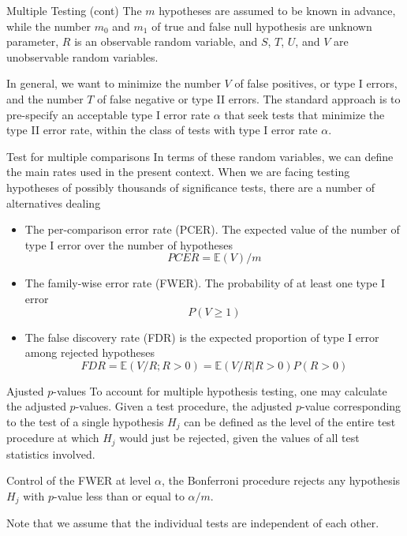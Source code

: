 \documentclass{beamer}
\begin{document}
\begin{frame}{Multiple Testing (cont)}	
	The $m$ hypotheses are assumed to be known in advance, while the number $m_0$ and $m_1$ of true and false null hypothesis are unknown parameter, $R$ is an observable random variable, and $S$, $T$, $U$, and $V$ are unobservable random variables. 
	
	In general, we want to minimize the number $V$ of false positives, or type I errors, and the number $T$ of false negative or type II errors. The standard approach is to pre-specify an acceptable type I error rate $\alpha$ that seek tests that minimize the type II error rate, within the class of tests with type I error rate $\alpha$. 
	

\end{frame}

\begin{frame}{Test for multiple comparisons}
	In terms of these random variables, we can define the main rates used in the present context.
When we are facing testing hypotheses of possibly thousands of significance tests, there are a 
number of alternatives dealing  	
\begin{itemize}
	\item The per-comparison error rate (PCER). The expected value of the number of type I error over the number of hypotheses
	\begin{equation*}
		PCER= \mathbb{E}(V)/m
	\end{equation*}
	\item The family-wise error rate (FWER). The probability of at least one type I error
	\begin{equation*}
		P(V\ge 1)
	\end{equation*}
	\item The false discovery rate (FDR) is the expected proportion of type I error among rejected hypotheses
	\begin{equation*}
		FDR=\mathbb{E}(V/R; R>0)=\mathbb{E}(V/R|R>0) P(R>0)
	\end{equation*}
\end{itemize}
\end{frame}


\begin{frame}{Ajusted $p$-values}
	To account for multiple hypothesis testing, one may calculate the adjusted $p$-values. Given a test procedure, the adjusted $p$-value corresponding to the test of a single hypothesis $H_j$ can be defined as the level of the entire test procedure at which $H_j$ would just be rejected, given the values of all test statistics involved.
	
	Control of the FWER at level $\alpha$, the Bonferroni procedure rejects any hypothesis $H_j$ with $p$-value less than or equal to $\alpha/m$.
	
	Note that we assume that the individual tests are independent of each other.  
\end{frame}
\end{document}
